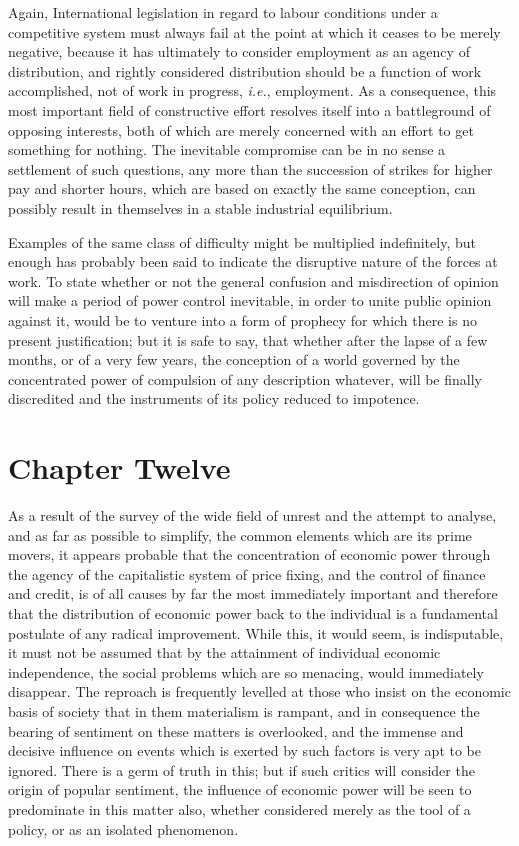 \documentclass{book}
\begin{document}
Again, International legislation in regard to labour conditions under a competitive system must always fail at the point at which it ceases to be merely negative, because it has ultimately to consider employment as an agency of distribution, and rightly considered distribution should be a function of work accomplished, not of work in progress, \emph{i.e.}, employment. As a consequence, this most important field of constructive effort resolves itself into a battleground of opposing interests, both of which are merely concerned with an effort to get something for nothing. The inevitable compromise can be in no sense a settlement of such questions, any more than the succession of strikes for higher pay and shorter hours, which are based on exactly the same conception, can possibly result in themselves in a stable industrial equilibrium.

Examples of the same class of difficulty might be multiplied indefinitely, but enough has probably been said to indicate the disruptive nature of the forces at work. To state whether or not the general confusion and misdirection of opinion will make a period of power control inevitable, in order to unite public opinion against it, would be to venture into a form of prophecy for which there is no present justification; but it is safe to say, that whether after the lapse of a few months, or of a very few years, the conception of a world governed by the concentrated power of compulsion of any description whatever, will be finally discredited and the instruments of its policy reduced to impotence.

\chapter{Chapter Twelve}
\label{chapter-12}
As a result of the survey of the wide field of unrest and the attempt to analyse, and as far as possible to simplify, the common elements which are its prime movers, it appears probable that the concentration of economic power through the agency of the capitalistic system of price fixing, and the control of finance and credit, is of all causes by far the most immediately important and therefore that the distribution of economic power back to the individual is a fundamental postulate of any radical improvement. While this, it would seem, is indisputable, it must not be assumed that by the attainment of individual economic independence, the social problems which are so menacing, would immediately disappear. The reproach is frequently levelled at those who insist on the economic basis of society that in them materialism is rampant, and in consequence the bearing of sentiment on these matters is overlooked, and the immense and decisive influence on events which is exerted by such factors is very apt to be ignored. There is a germ of truth in this; but if such critics will consider the origin of popular sentiment, the influence of economic power will be seen to predominate in this matter also, whether considered merely as the tool of a policy, or as an isolated phenomenon.
\end{document}

